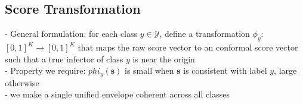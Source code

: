 \subsection{Score Transformation}
- General formulation: for each class $y \in \mathcal{Y}$, define a transformation $\phi_y$:$[0,1]^K \to [0,1]^K$ that maps the raw score vector to an conformal score vector such that a true infector of class $y$ is near the origin\\
- Property we require: $phi_y(\mathbf{s})$ is small when $\mathbf{s}$ is consistent with label $y$, large otherwise\\
- we make a single unified envelope coherent across all classes